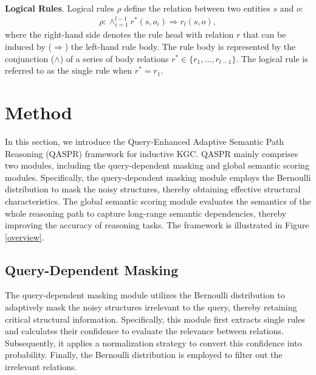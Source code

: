 \documentclass[sigconf]{acmart}
\begin{document}
\textbf{Logical Rules}. Logical rules $\rho$ \cite{sadeghian2019drum, wang2024large} define the relation between two entities $s$ and $o$:
\begin{equation}
\label{logical_rule}
\begin{aligned}
    \rho:\wedge_{i=1}^{l-1}r^{*}(s,o_i) \Rightarrow r_l(s,o),
\end{aligned}
\end{equation}
where the right-hand side denotes the rule head with relation $r$ that can be induced by ($\Rightarrow$) the left-hand rule body. The rule body is represented by the conjunction ($\wedge$) of a series of body relations $r^* \in \{r_1,...,r_{l-1}\}$. The logical rule is referred to as the single rule when $r^*= r_1$. 


\section{Method}
In this section, we introduce the Query-Enhanced Adaptive Semantic Path Reasoning (QASPR) framework for inductive KGC. QASPR mainly comprises two modules, including the query-dependent masking and global semantic scoring modules. Specifically, the query-dependent masking module employs the Bernoulli distribution \cite{zhu2021graph} to mask the noisy structures, thereby obtaining effective structural characteristics. The global semantic scoring module evaluates the semantics of the whole reasoning path to capture long-range semantic dependencies, thereby improving the accuracy of reasoning tasks. The framework is illustrated in Figure \ref{overview}.

\subsection{Query-Dependent Masking}
The query-dependent masking module utilizes the Bernoulli distribution to adaptively mask the noisy structures irrelevant to the query, thereby retaining critical structural information. Specifically, this module first extracts single rules and calculates their confidence to evaluate the relevance between relations. Subsequently, it applies a normalization strategy to convert this confidence into probability. Finally, the Bernoulli distribution is employed to filter out the irrelevant relations. %
\end{document}
